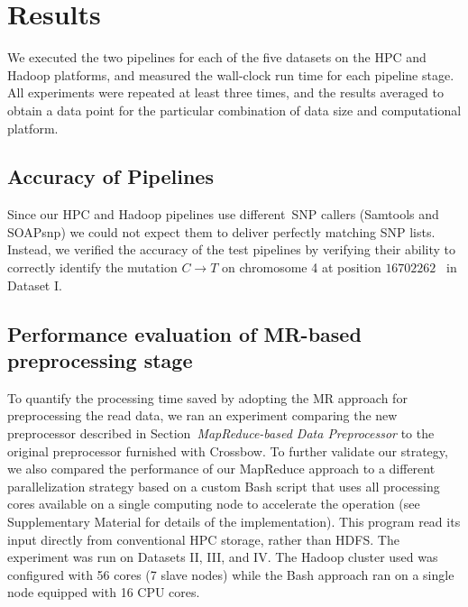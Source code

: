 \documentclass[10pt]{article}
\begin{document}
\section*{Results}


We executed the two pipelines for each of the five 
datasets on the HPC and Hadoop platforms, and measured the wall-clock run time for each pipeline stage.  
All experiments were repeated at least three times, 
and the results averaged to obtain a data point for the
particular combination of data size and computational platform.

\subsection*{Accuracy of Pipelines}
Since our HPC and Hadoop pipelines use different~SNP callers (Samtools and
SOAPsnp) we could not expect them to deliver perfectly
matching SNP lists. Instead, we verified the accuracy of the test pipelines by
verifying their ability to correctly identify the mutation $C\rightarrow T$ on
chromosome 4 at position $16702262$~\cite{schneeberger} in Dataset I.



\subsection*{Performance evaluation of MR-based preprocessing stage}

To quantify the processing time saved by adopting the MR approach for
preprocessing the read data, we ran an
experiment comparing the new preprocessor described in
Section~{\it MapReduce-based Data Preprocessor} to the original preprocessor furnished with
Crossbow.  To further validate our strategy, we also compared the performance of
our MapReduce approach to a different parallelization strategy based on a custom Bash script
that uses all processing cores available on a single computing node to accelerate the operation (see
Supplementary Material for details of the implementation). This program read its
input directly from conventional HPC storage, rather than HDFS\@.  The experiment
was run on Datasets II, III, and IV\@.  The Hadoop cluster used was configured
with 56 cores (7 slave nodes) while the Bash approach ran on a single node
equipped with 16 CPU cores.
\end{document}
